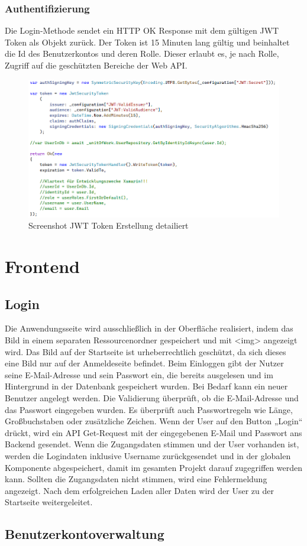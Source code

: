 \newpage
\subsubsection{Authentifizierung}
\author{Stefano Pyringer}
Die Login-Methode sendet ein HTTP OK Response mit dem gültigen JWT Token als Objekt zurück. 
Der Token ist 15 Minuten lang gültig und beinhaltet die Id des Benutzerkontos und deren Rolle. 
Dieser erlaubt es, je nach Rolle, Zugriff auf die geschützten Bereiche der Web API.

\begin{figure}[h]
    \includegraphics*[width=15cm]{./pics/screenshot_jwt_create.png}
    \caption[JWT create]{Screenshot JWT Token Erstellung detailiert}
\end{figure}

\newpage
\section{Frontend}
\author{Mirzet Sakonjic}
\subsection*{Login}
Die Anwendungsseite wird ausschließlich in der Oberfläche realisiert, 
indem das Bild in einem separaten Ressourcenordner gespeichert und mit <img> 
angezeigt wird. Das Bild auf der Startseite ist urheberrechtlich geschützt, 
da sich dieses eine Bild nur auf der Anmeldeseite befindet. Beim Einloggen gibt 
der Nutzer seine E-Mail-Adresse und sein Passwort ein, die bereits ausgelesen 
und im Hintergrund in der Datenbank gespeichert wurden. Bei Bedarf kann ein 
neuer Benutzer angelegt werden. Die Validierung überprüft, ob die E-Mail-Adresse 
und das Passwort eingegeben wurden. Es überprüft auch Passwortregeln wie Länge, 
Großbuchstaben oder zusätzliche Zeichen.
Wenn der User auf den Button „Login“ drückt, wird ein API Get-Request mit der
eingegebenen E-Mail und Passwort ans Backend gesendet. Wenn die Zugangsdaten
stimmen und der User vorhanden ist, werden die Logindaten inklusive Username
zurückgesendet und in der globalen Komponente abgespeichert, damit im gesamten
Projekt darauf zugegriffen werden kann.
Sollten die Zugangsdaten nicht stimmen, wird eine Fehlermeldung angezeigt.
Nach dem erfolgreichen Laden aller Daten wird der User zu der Startseite
weitergeleitet.

\subsection*{Benutzerkontoverwaltung}